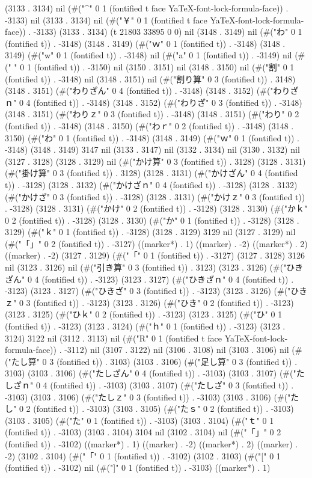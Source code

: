 (3133 . 3134) nil (#("^" 0 1 (fontified t face YaTeX-font-lock-formula-face)) . -3133) nil (3133 . 3134) nil (#("￥" 0 1 (fontified t face YaTeX-font-lock-formula-face)) . -3133) (3133 . 3134) (t 21803 33895 0 0) nil (3148 . 3149) nil (#("わ" 0 1 (fontified t)) . -3148) (3148 . 3149) (#("ｗ" 0 1 (fontified t)) . -3148) (3148 . 3149) (#("w" 0 1 (fontified t)) . -3148) nil (#("a" 0 1 (fontified t)) . -3149) nil (#("
" 0 1 (fontified t)) . -3150) nil (3150 . 3151) nil (3148 . 3150) nil (#("割" 0 1 (fontified t)) . -3148) nil (3148 . 3151) nil (#("割り算" 0 3 (fontified t)) . 3148) (3148 . 3151) (#("わりざん" 0 4 (fontified t)) . -3148) (3148 . 3152) (#("わりざｎ" 0 4 (fontified t)) . -3148) (3148 . 3152) (#("わりざ" 0 3 (fontified t)) . -3148) (3148 . 3151) (#("わりｚ" 0 3 (fontified t)) . -3148) (3148 . 3151) (#("わり" 0 2 (fontified t)) . -3148) (3148 . 3150) (#("わｒ" 0 2 (fontified t)) . -3148) (3148 . 3150) (#("わ" 0 1 (fontified t)) . -3148) (3148 . 3149) (#("ｗ" 0 1 (fontified t)) . -3148) (3148 . 3149) 3147 nil (3133 . 3147) nil (3132 . 3134) nil (3130 . 3132) nil (3127 . 3128) (3128 . 3129) nil (#("かけ算" 0 3 (fontified t)) . 3128) (3128 . 3131) (#("掛け算" 0 3 (fontified t)) . 3128) (3128 . 3131) (#("かけざん" 0 4 (fontified t)) . -3128) (3128 . 3132) (#("かけざｎ" 0 4 (fontified t)) . -3128) (3128 . 3132) (#("かけざ" 0 3 (fontified t)) . -3128) (3128 . 3131) (#("かけｚ" 0 3 (fontified t)) . -3128) (3128 . 3131) (#("かけ" 0 2 (fontified t)) . -3128) (3128 . 3130) (#("かｋ" 0 2 (fontified t)) . -3128) (3128 . 3130) (#("か" 0 1 (fontified t)) . -3128) (3128 . 3129) (#("ｋ" 0 1 (fontified t)) . -3128) (3128 . 3129) 3129 nil (3127 . 3129) nil (#("「」" 0 2 (fontified t)) . -3127) ((marker*) . 1) ((marker) . -2) ((marker*) . 2) ((marker) . -2) (3127 . 3129) (#("「" 0 1 (fontified t)) . -3127) (3127 . 3128) 3126 nil (3123 . 3126) nil (#("引き算" 0 3 (fontified t)) . 3123) (3123 . 3126) (#("ひきざん" 0 4 (fontified t)) . -3123) (3123 . 3127) (#("ひきざｎ" 0 4 (fontified t)) . -3123) (3123 . 3127) (#("ひきざ" 0 3 (fontified t)) . -3123) (3123 . 3126) (#("ひきｚ" 0 3 (fontified t)) . -3123) (3123 . 3126) (#("ひき" 0 2 (fontified t)) . -3123) (3123 . 3125) (#("ひｋ" 0 2 (fontified t)) . -3123) (3123 . 3125) (#("ひ" 0 1 (fontified t)) . -3123) (3123 . 3124) (#("ｈ" 0 1 (fontified t)) . -3123) (3123 . 3124) 3122 nil (3112 . 3113) nil (#("R" 0 1 (fontified t face YaTeX-font-lock-formula-face)) . -3112) nil (3107 . 3122) nil (3106 . 3108) nil (3103 . 3106) nil (#("たし算" 0 3 (fontified t)) . 3103) (3103 . 3106) (#("足し算" 0 3 (fontified t)) . 3103) (3103 . 3106) (#("たしざん" 0 4 (fontified t)) . -3103) (3103 . 3107) (#("たしざｎ" 0 4 (fontified t)) . -3103) (3103 . 3107) (#("たしざ" 0 3 (fontified t)) . -3103) (3103 . 3106) (#("たしｚ" 0 3 (fontified t)) . -3103) (3103 . 3106) (#("たし" 0 2 (fontified t)) . -3103) (3103 . 3105) (#("たｓ" 0 2 (fontified t)) . -3103) (3103 . 3105) (#("た" 0 1 (fontified t)) . -3103) (3103 . 3104) (#("ｔ" 0 1 (fontified t)) . -3103) (3103 . 3104) 3104 nil (3102 . 3104) nil (#("「」" 0 2 (fontified t)) . -3102) ((marker*) . 1) ((marker) . -2) ((marker*) . 2) ((marker) . -2) (3102 . 3104) (#("「" 0 1 (fontified t)) . -3102) (3102 . 3103) (#("[" 0 1 (fontified t)) . -3102) nil (#("]" 0 1 (fontified t)) . -3103) ((marker*) . 1) 